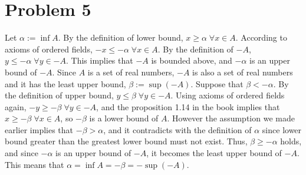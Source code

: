 \documentclass{scrartcl}
\begin{document}
\section{Problem 5}
Let \(\alpha := \inf A\). By the definition of lower bound, \(x \geq \alpha \; \forall x \in A\). According to axioms of ordered fields, \(-x \leq -\alpha \; \forall x \in A\). By the definition of \(-A\), \(y \leq -\alpha \; \forall y \in -A\). This implies that \(-A\) is bounded above, and \(-\alpha\) is an upper bound of \(-A\). Since \(A\) is a set of real numbers, \(-A\) is also a set of real numbers and it has the least upper bound, \(\beta := \sup (-A)\). Suppose that \(\beta < -\alpha\). By the definition of upper bound, \(y \leq \beta \; \forall y \in -A\). Using axioms of ordered fields again, \(-y \geq -\beta \; \forall y \in -A\), and the proposition 1.14 in the book implies that \(x \geq -\beta \; \forall x \in A\), so \(-\beta\) is a lower bound of \(A\). However the assumption we made earlier implies that \(-\beta > \alpha\), and it contradicts with the definition of \(\alpha\) since lower bound greater than the greatest lower bound must not exist. Thus, \(\beta \geq -\alpha\) holds, and since \(-\alpha\) is an upper bound of \(-A\), it becomes the least upper bound of \(-A\). This means that \(\alpha = \inf A = -\beta = -\sup(-A)\).
\end{document}
